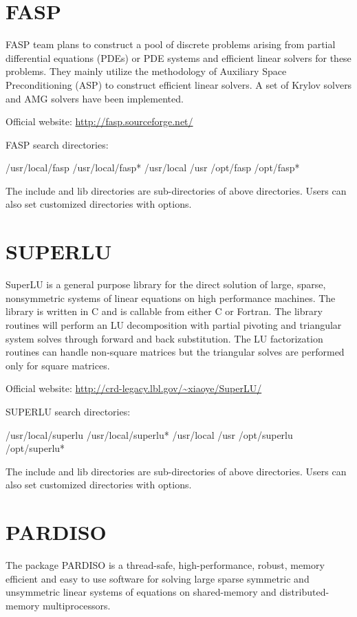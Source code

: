 \documentclass[12pt]{book}
\begin{document}
\section{FASP}
FASP team plans to construct a pool of discrete problems arising from partial differential equations (PDEs) or PDE systems and efficient linear solvers for these problems. They mainly utilize the methodology of Auxiliary Space Preconditioning (ASP) to construct efficient linear solvers. A set of Krylov solvers and AMG solvers have been implemented. 

Official website: \url{http://fasp.sourceforge.net/}

FASP search directories:
\begin{evb}
/usr/local/fasp
/usr/local/fasp*
/usr/local
/usr
/opt/fasp 
/opt/fasp*
\end{evb}
The include and lib directories are sub-directories of above directories. Users can also set customized directories with options.

\section{SUPERLU}
SuperLU is a general purpose library for the direct solution of large, sparse, nonsymmetric systems of linear equations on high performance machines. The library is written in C and is callable from either C or Fortran. The library routines will perform an LU decomposition with partial pivoting and triangular system solves through forward and back substitution. The LU factorization routines can handle non-square matrices but the triangular solves are performed only for square matrices.

Official website: \url{http://crd-legacy.lbl.gov/~xiaoye/SuperLU/}

SUPERLU search directories:
\begin{evb}
/usr/local/superlu
/usr/local/superlu*
/usr/local
/usr
/opt/superlu 
/opt/superlu*
\end{evb}

The include and lib directories are sub-directories of above directories. Users can also set customized directories with options.

\section{PARDISO}
The package PARDISO is a thread-safe, high-performance, robust, memory efficient and easy to use software for solving large sparse symmetric and unsymmetric linear systems of equations on shared-memory and distributed-memory multiprocessors. 
\end{document}
